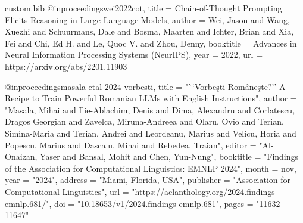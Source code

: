 \begin{filecontents*}[overwrite]{custom.bib}
@inproceedings{wei2022cot,
  title        = {Chain-of-Thought Prompting Elicits Reasoning in Large Language Models},
  author       = {Wei, Jason and Wang, Xuezhi and Schuurmans, Dale and Bosma, Maarten and Ichter, Brian and Xia, Fei and Chi, Ed H. and Le, Quoc V. and Zhou, Denny},
  booktitle    = {Advances in Neural Information Processing Systems (NeurIPS)},
  year         = {2022},
  url          = {https://arxiv.org/abs/2201.11903}
}

@inproceedings{masala-etal-2024-vorbesti,
    title = "``Vorbe{\c s}ti Rom{\^a}ne{\c s}te?'' A Recipe to Train Powerful {R}omanian {LLM}s with {E}nglish Instructions",
    author = "Masala, Mihai  and
      Ilie-Ablachim, Denis  and
      Dima, Alexandru  and
      Corlatescu, Dragos Georgian  and
      Zavelca, Miruna-Andreea  and
      Olaru, Ovio  and
      Terian, Simina-Maria  and
      Terian, Andrei  and
      Leordeanu, Marius  and
      Velicu, Horia  and
      Popescu, Marius  and
      Dascalu, Mihai  and
      Rebedea, Traian",
    editor = "Al-Onaizan, Yaser  and
      Bansal, Mohit  and
      Chen, Yun-Nung",
    booktitle = "Findings of the Association for Computational Linguistics: EMNLP 2024",
    month = nov,
    year = "2024",
    address = "Miami, Florida, USA",
    publisher = "Association for Computational Linguistics",
    url = "https://aclanthology.org/2024.findings-emnlp.681/",
    doi = "10.18653/v1/2024.findings-emnlp.681",
    pages = "11632--11647"
}
\end{filecontents*}

\documentclass[11pt]{article}

\usepackage[review]{acl}

\usepackage{times}
\usepackage{latexsym}

\usepackage[T1]{fontenc}

\usepackage[utf8]{inputenc}

\usepackage{microtype}

